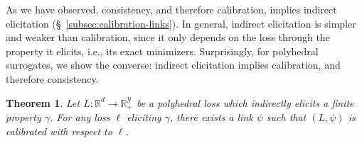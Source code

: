 \documentclass[11pt]{article}
\newcommand{\reals}{\mathbb{R}}
\newcommand{\prop}[1]{\mathrm{prop}[#1]}
\newcommand{\simplex}{\Delta_\Y}
\newcommand{\R}{\mathcal{R}}
\newcommand{\Y}{\mathcal{Y}}
\newcommand{\toto}{\rightrightarrows}
\newtheorem{theorem}{Theorem}
\newtheorem{definition}{Definition}
\begin{document}

%




As we have observed, consistency, and therefore calibration, implies indirect elicitation (\S~\ref{subsec:calibration-links}).
In general, indirect elicitation is simpler and weaker than calibration, since it only depends on the loss through the property it elicits, i.e., its exact minimizers.
Surprisingly, for polyhedral surrogates, we show the converse: indirect elicitation implies calibration, and therefore consistency.

\begin{theorem}\label{thm:poly-ie-implies-consistent}
	Let $L:\reals^d \to \reals^\Y_+$ be a polyhedral loss which indirectly elicits a finite property $\gamma$.
  For any loss $\ell$ eliciting $\gamma$, there exists a link $\psi$ such that $(L, \psi)$ is calibrated with respect to $\ell$.
\end{theorem}
\end{document}
